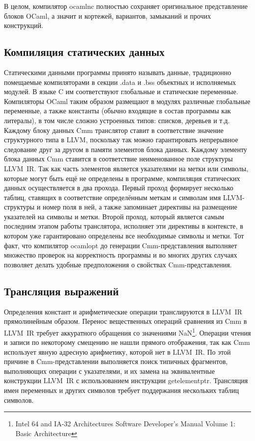 \documentclass[a4paper, 12pt]{article}
\begin{document}
В целом, компилятор ocamlnc полностью сохраняет оригинальное представление блоков OCaml, а значит и кортежей,
вариантов, замыканий и прочих конструкций.

\subsection{Компиляция статических данных}
Статическими данными программы принято называть данные, традиционно помещаемые компиляторами в секции .data и .bss
объектных и исполняемых модулей. В языке C им соответствуют глобальные и статические переменные. Компиляторы OCaml
таким образом размещают в модулях различные глобальные переменные, а также константы (обычно входящие в состав
программы как литералы), в том числе сложно устроенных типов: списков, деревьев и т.д.  Каждому блоку данных Cmm
транслятор ставит в соответствие значение структурного типа в LLVM, поскольку так можно гарантировать непрерывное
следование друг за другом в памяти элементов блока данных. Каждому элементу блока данных Cmm ставится в соответствие
неименованное поле структуры LLVM~IR. Так как часть элементов является указателями на метки или символы, которые могут
быть ещё не определены в программе, компиляция статических данных осуществляется в два прохода. Первый проход формирует
несколько таблиц, ставящих в соответствие определённым меткам и символам имя LLVM-структуры и номер поля в ней, а также
запоминает директивы на размещение указателей на символы и метки. Второй проход, который является самым последним этапом
работы транслятора, исполняет эти директивы в контексте, в котором уже гарантировано определены все необходимые символы
и метки. Тот факт, что компилятор ocamlopt до генерации Cmm-представления выполняет множество проверок на корректность
программы и во многих других случаях позволяет делать удобные предположения о свойствах Cmm-представления.

\subsection{Трансляция выражений}
Определения констант и арифметические операции транслируются в LLVM~IR прямолинейным образом.
Перенос вещественных операций сравнения из Cmm в LLVM~IR требует аккуратного обращения со значениями
NaN\footnote{Intel 64 and IA-32 Architectures Software Developer's Manual Volume 1: Basic Architecture}.
Операции чтения и записи по некоторому смещению не нашли прямого отображения, так как Cmm использует
явную адресную арифметику, которой нет в LLVM~IR. По этой причине в Cmm-представлении выполняется поиск типичных
фрагментов, выполняющих операции с указателями, и их замена на эквивалентные конструкции LLVM~IR с
использованием инструкции getelementptr. Трансляция имен переменных и других символов требует поддержания нескольких
таблиц символов.
\end{document}
